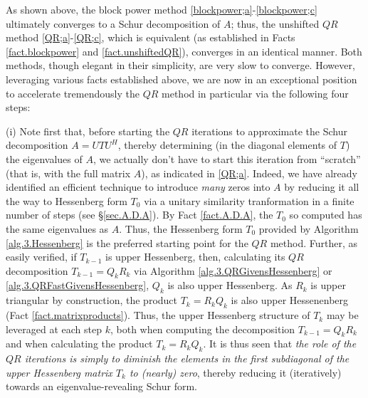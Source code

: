 
\noindent As shown above, the block power method \eqref{blockpower;a}-\eqref{blockpower;c} ultimately converges to a Schur decomposition of $A$; thus, the unshifted
$QR$ method \eqref{QR;a}-\eqref{QR;c}, which is equivalent (as established in Facts \ref{fact.blockpower} and \ref{fact.unshiftedQR}), converges in an identical manner.
Both methods, though elegant in their simplicity, are very slow to converge.
However, leveraging various facts established above, we are now in an exceptional position to accelerate tremendously the $QR$ method in particular via the following
four steps:\vskip0.1in

\noindent (i)
Note first that, before starting the $QR$ iterations to approximate the Schur decomposition $A=UTU^H$, thereby determining (in the diagonal elements of $T$)
the eigenvalues of $A$, we actually don't have to start this iteration from ``scratch'' (that is, with the full matrix $A$), as indicated in
\eqref{QR;a}.  Indeed, we have already identified an efficient technique to introduce {\it many} zeros into $A$ by reducing it all the way
to Hessenberg form $T_0$ via a unitary similarity tranformation in a finite number of steps (see \S \ref{sec.A.D.A}).
By Fact \ref{fact.A.D.A}, the $T_0$ so computed has the same eigenvalues as $A$.
Thus, {the Hessenberg form $T_0$ provided by Algorithm \ref{alg.3.Hessenberg} is the preferred starting point for the $QR$ method.}
Further, as easily verified, if $T_{k-1}$ is upper Hessenberg, then, calculating its $QR$ decomposition $T_{k-1}={Q}_{k} {R}_{k}$
via Algorithm \ref{alg.3.QRGivensHessenberg} or \ref{alg.3.QRFastGivensHessenberg},
${Q}_{k}$ is also upper Hessenberg.  As ${R}_{k}$ is upper triangular by construction, the product $T_{k} = {R}_{k} {Q}_{k}$
is also upper Hessenenberg (Fact \ref{fact.matrixproducts}).  Thus, the upper Hessenberg structure of $T_{k}$ may be leveraged at each step $k$, both when computing the
decomposition $T_{k-1}={Q}_{k} {R}_{k}$ and when calculating the product $T_{k} = {R}_{k} {Q}_{k}$.  It is thus seen that
{\it the role of the $QR$ iterations is simply to diminish the elements in the first subdiagonal of the upper Hessenberg matrix $T_{k}$ to (nearly) zero},
thereby reducing it (iteratively) towards an eigenvalue-revealing Schur form.\vskip0.1in

